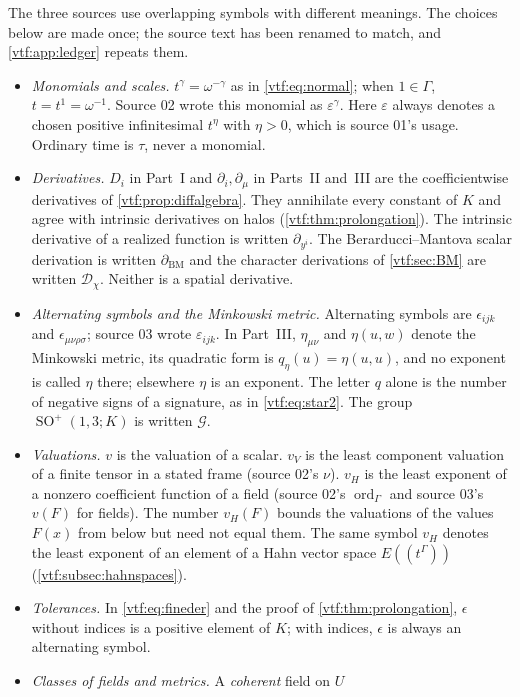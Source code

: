 \documentclass[11pt,letterpaper]{article}
\theoremstyle{definition}
\theoremstyle{remark}
\newcommand{\SO}{\operatorname{SO}}\newcommand{\SL}{\operatorname{SL}}
\newcommand{\vH}{v_{\!H}}
\newcommand{\eps}{\varepsilon}
\newcommand{\BM}{\partial_{\mathrm{BM}}}
\begin{document}
The three sources use overlapping symbols with different meanings. The choices
below are made once; the source text has been renamed to match, and
\cref{vtf:app:ledger} repeats them.
\begin{itemize}
\item \emph{Monomials and scales.} $t^\gamma=\omega^{-\gamma}$ as in
\eqref{vtf:eq:normal}; when $1\in\Gamma$, $t=t^1=\omega^{-1}$. Source 02 wrote
this monomial as $\eps^\gamma$. Here $\eps$ always denotes a chosen positive
infinitesimal $t^\eta$ with $\eta>0$, which is source 01's usage. Ordinary time
is $\tau$, never a monomial.
\item \emph{Derivatives.} $D_i$ in Part~I and $\partial_i,\partial_\mu$ in
Parts~II and~III are the coefficientwise derivatives of
\cref{vtf:prop:diffalgebra}. They annihilate every constant of $K$ and agree with
intrinsic derivatives on halos (\cref{vtf:thm:prolongation}). The intrinsic
derivative of a realized function is written $\partial_{y^i}$. The
Berarducci--Mantova scalar derivation is written $\BM$ and the character
derivations of \cref{vtf:sec:BM} are written $\mathscr D_\chi$. Neither is a
spatial derivative.
\item \emph{Alternating symbols and the Minkowski metric.} Alternating symbols are
$\epsilon_{ijk}$ and $\epsilon_{\mu\nu\rho\sigma}$; source 03 wrote
$\varepsilon_{ijk}$. In Part~III, $\eta_{\mu\nu}$ and $\eta(u,w)$ denote the
Minkowski metric, its quadratic form is $q_\eta(u)=\eta(u,u)$, and no exponent
is called $\eta$ there; elsewhere $\eta$ is an exponent. The letter $q$ alone is
the number of negative signs of a signature, as in \eqref{vtf:eq:star2}. The group
$\SO^+(1,3;K)$ is written $\mathcal G$.
\item \emph{Valuations.} $v$ is the valuation of a scalar. $v_V$ is the least
component valuation of a finite tensor in a stated frame (source 02's $\nu$).
$\vH$ is the least exponent of a nonzero coefficient function of a field
(source 02's $\operatorname{ord}_\Gamma$ and source 03's $v(F)$ for fields). The
number $\vH(F)$ bounds the valuations of the values $F(x)$ from below but need
not equal them. The same symbol $\vH$ denotes the least exponent of an element of
a Hahn vector space $E((t^\Gamma))$ (\cref{vtf:subsec:hahnspaces}).
\item \emph{Tolerances.} In \eqref{vtf:eq:fineder} and the proof of
\cref{vtf:thm:prolongation}, $\epsilon$ without indices is a positive element of
$K$; with indices, $\epsilon$ is always an alternating symbol.
\item \emph{Classes of fields and metrics.} A \emph{coherent} field on $U$

\end{itemize}
\end{document}
